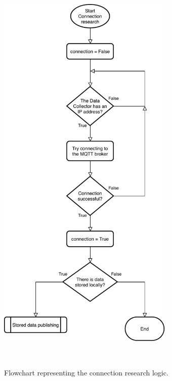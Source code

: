 \begin{figure}[h!]
\begin{minipage}[b]{8.5cm}
\centering
\includegraphics[width=0.75\textwidth]{images/flowconnection}
\caption{Flowchart representing the connection research logic.}
\label{fig:flowconnection}
\end{minipage}
\ \hspace{2mm} \
\begin{minipage}[b]{8.5cm}
\centering

\end{minipage}
\end{figure}
